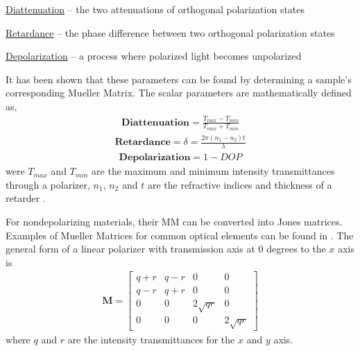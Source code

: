 
\underline{Diattenuation} – the two attenuations of orthogonal polarization states \cite{chipman}

\underline{Retardance} – the phase difference between two orthogonal polarization states \cite{giakos}

\underline{Depolarization} – a process where polarized light becomes unpolarized \cite{giakos}

It has been shown that these parameters can be found by determining a sample's corresponding Mueller Matrix. The scalar parameters are mathematically defined as,
\begin{align}
    \mathbf{Diattenuation} = \frac{T_{max} - T_{min}}{T_{max} + T_{min}}
\end{align}
\begin{align}
    \mathbf{Retardance} = \delta = \frac{2\pi(n_1 - n_2)t}{\lambda}
\end{align}
\begin{align}
    \mathbf{Depolarization} = 1 - DOP
\end{align}
were $T_{max}$ and $T_{min}$ are the maximum and minimum intensity transmittances through a polarizer, $n_1$, $n_2$ and $t$ are the refractive indices and thickness of a retarder \cite{chipman}.

For nondepolarizing materials, their MM can be converted into Jones matrices.   Examples of Mueller Matrices for common optical elements can be found in \cite{chipman}.  The general form of a linear polarizer with transmission axis at 0 degrees to the $x$ axis is
%
\begin{align}
    \mathbf{M} =
    \begin{bmatrix}
        q + r & q - r & 0 & 0 \\
        q-r & q+r & 0  & 0 \\
        0 & 0 & 2\sqrt{qr} & 0 \\
        0 & 0 & 0 & 2\sqrt{qr}
    \end{bmatrix}
\end{align}
%
where $q$ and $r$ are the intensity transmittances for the $x$ and $y$ axis.

